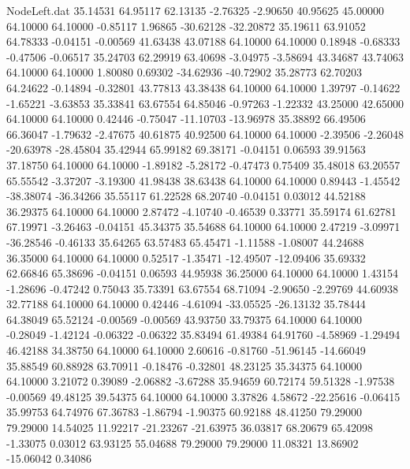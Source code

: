 \begin{filecontents}{NodeLeft.dat}
  35.14531   64.95117   62.13135    -2.76325   -2.90650   40.95625   45.00000   64.10000   64.10000   -0.85117    1.96865  -30.62128  -32.20872
  35.19611   63.91052   64.78333    -0.04151   -0.00569   41.63438   43.07188   64.10000   64.10000    0.18948   -0.68333   -0.47506   -0.06517
  35.24703   62.29919   63.40698    -3.04975   -3.58694   43.34687   43.74063   64.10000   64.10000    1.80080    0.69302  -34.62936  -40.72902
  35.28773   62.70203   64.24622    -0.14894   -0.32801   43.77813   43.38438   64.10000   64.10000    1.39797   -0.14622   -1.65221   -3.63853
  35.33841   63.67554   64.85046    -0.97263   -1.22332   43.25000   42.65000   64.10000   64.10000    0.42446   -0.75047  -11.10703  -13.96978
  35.38892   66.49506   66.36047    -1.79632   -2.47675   40.61875   40.92500   64.10000   64.10000   -2.39506   -2.26048  -20.63978  -28.45804
  35.42944   65.99182   69.38171    -0.04151    0.06593   39.91563   37.18750   64.10000   64.10000   -1.89182   -5.28172   -0.47473    0.75409
  35.48018   63.20557   65.55542    -3.37207   -3.19300   41.98438   38.63438   64.10000   64.10000    0.89443   -1.45542  -38.38074  -36.34266
  35.55117   61.22528   68.20740    -0.04151    0.03012   44.52188   36.29375   64.10000   64.10000    2.87472   -4.10740   -0.46539    0.33771
  35.59174   61.62781   67.19971    -3.26463   -0.04151   45.34375   35.54688   64.10000   64.10000    2.47219   -3.09971  -36.28546   -0.46133
  35.64265   63.57483   65.45471    -1.11588   -1.08007   44.24688   36.35000   64.10000   64.10000    0.52517   -1.35471  -12.49507  -12.09406
  35.69332   62.66846   65.38696    -0.04151    0.06593   44.95938   36.25000   64.10000   64.10000    1.43154   -1.28696   -0.47242    0.75043
  35.73391   63.67554   68.71094    -2.90650   -2.29769   44.60938   32.77188   64.10000   64.10000    0.42446   -4.61094  -33.05525  -26.13132
  35.78444   64.38049   65.52124    -0.00569   -0.00569   43.93750   33.79375   64.10000   64.10000   -0.28049   -1.42124   -0.06322   -0.06322
  35.83494   61.49384   64.91760    -4.58969   -1.29494   46.42188   34.38750   64.10000   64.10000    2.60616   -0.81760  -51.96145  -14.66049
  35.88549   60.88928   63.70911    -0.18476   -0.32801   48.23125   35.34375   64.10000   64.10000    3.21072    0.39089   -2.06882   -3.67288
  35.94659   60.72174   59.51328    -1.97538   -0.00569   49.48125   39.54375   64.10000   64.10000    3.37826    4.58672  -22.25616   -0.06415
  35.99753   64.74976   67.36783    -1.86794   -1.90375   60.92188   48.41250   79.29000   79.29000   14.54025   11.92217  -21.23267  -21.63975
  36.03817   68.20679   65.42098    -1.33075    0.03012   63.93125   55.04688   79.29000   79.29000   11.08321   13.86902  -15.06042    0.34086

\end{filecontents}
